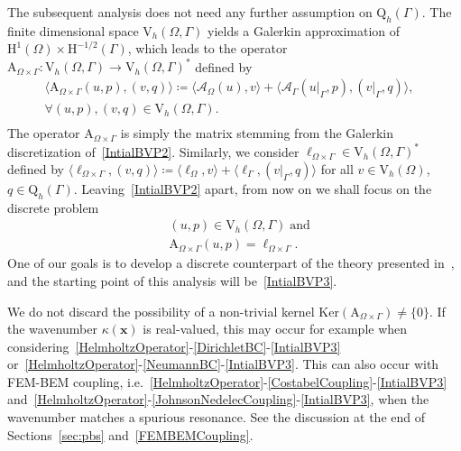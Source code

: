 \documentclass[a4paper,11pt]{article}
\newcommand{\mrm}{\mathrm}
\newcommand{\mA}{\mathrm{A}}
\newcommand{\mH}{\mathrm{H}}
\newcommand{\mQ}{\mathrm{Q}}
\newcommand{\Vh}{\mathrm{V}_{h}}
\newcommand{\Qh}{\mathrm{Q}_{h}}
\newcommand{\bx}{\boldsymbol{x}}
\begin{document}
The subsequent analysis does not need any further assumption on
$\mQ_h(\Gamma)$. The finite dimensional space $\Vh(\Omega,\Gamma)$ yields a Galerkin approximation of
$\mH^{1}(\Omega)\times\mH^{-1/2}(\Gamma)$, which leads to the operator
$\mA_{\Omega\times \Gamma}\colon \Vh(\Omega,\Gamma)\to\Vh(\Omega,\Gamma)^*$ defined by 
\begin{equation*}
  \begin{aligned}
  \langle \mA_{\Omega\times \Gamma}(u,p),(v,q)\rangle \coloneq
  \langle \mathcal{A}_{\Omega}(u),v\rangle+\langle
  \mathcal{A}_{\Gamma}(u\vert_{\Gamma},p),
  (v\vert_{\Gamma},q)\rangle,&\\
  \forall (u,p), (v,q) \in \Vh(\Omega,\Gamma).&\\
  \end{aligned}
\end{equation*}
The operator $\mA_{\Omega\times\Gamma}$ is simply the matrix stemming
from the Galerkin discretization of~\eqref{IntialBVP2}. Similarly, we
consider $\ell_{\Omega\times\Gamma}\in \Vh(\Omega,\Gamma)^*$ defined
by $\langle \ell_{\Omega\times\Gamma},(v,q)\rangle \coloneq \langle
\ell_{\Omega},v\rangle + \langle
\ell_\Gamma,(v\vert_{\Gamma},q)\rangle$ for all $v\in \Vh(\Omega)$,
$q\in\Qh(\Gamma)$. Leaving~\eqref{IntialBVP2} apart, from now on we
shall focus on the discrete problem
\begin{equation}\label{IntialBVP3}
  \begin{aligned}
    & (u,p)\in \Vh(\Omega,\Gamma)\;\text{and}\\
    & \mA_{\Omega\times \Gamma}(u,p) = \ell_{\Omega\times\Gamma}.
  \end{aligned}
\end{equation}
One of our goals is to develop a discrete
counterpart of the theory presented in~\cite{MR4665035}, and the
starting point of this analysis will be~\eqref{IntialBVP3}.

\medskip
We do not discard the possibility of a non-trivial kernel
$\mrm{Ker}(\mA_{\Omega\times\Gamma})\neq \{0\}$. If the wavenumber
$\kappa(\bx)$ is real-valued, this may occur for example when
considering~\eqref{HelmholtzOperator}-\eqref{DirichletBC}-\eqref{IntialBVP3}
or~\eqref{HelmholtzOperator}-\eqref{NeumannBC}-\eqref{IntialBVP3}. This can
also occur with FEM-BEM coupling,
i.e.~\eqref{HelmholtzOperator}-\eqref{CostabelCoupling}-\eqref{IntialBVP3}
and~\eqref{HelmholtzOperator}-\eqref{JohnsonNedelecCoupling}-\eqref{IntialBVP3},
when the wavenumber matches a spurious resonance. See the discussion at the end
of Sections~\ref{sec:pbs} and~\ref{FEMBEMCoupling}.
\end{document}
